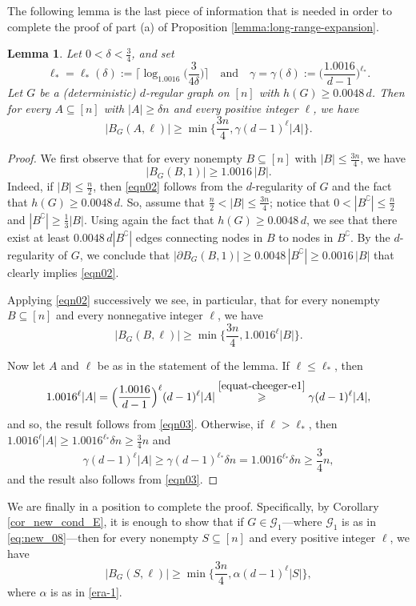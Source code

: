 \documentclass[11pt,leqno]{amsart}
\newtheorem{lemma}[theorem]{Lemma}
\theoremstyle{remark}
\theoremstyle{plain}
\begin{document}
The following lemma is the last piece of information that is needed in order to complete the proof of part (a)
of Proposition \ref{lemma:long-range-expansion}.
\begin{lemma} \label{lemCheeger}
Let $0<\delta< \frac{3}{4}$, and set
\begin{equation} \label{equat-cheeger-e1}
\ell_*=\ell_*(\delta):= \Big\lceil \log_{1.0016}\Big(\frac{3}{4\delta}\Big)\Big\rceil \ \ \ \text{ and } \ \ \
\gamma=\gamma(\delta):= \Big( \frac{1.0016}{d-1}\Big)^{\ell_*}.
\end{equation}
Let $G$ be a (deterministic) $d$-regular graph on $[n]$ with $h(G)\geqslant 0.0048\, d$. Then for every $A\subseteq [n]$
with $|A|\geqslant\delta n$ and every positive integer $\ell$, we have
\[ \big| B_G(A,\ell)\big| \geqslant \min\Big\{\frac{3n}{4},\gamma (d-1)^\ell|A|\Big\}. \]
\end{lemma}
\begin{proof}
We first observe that for every nonempty $B\subseteq [n]$ with $|B|\leqslant \frac{3n}{4}$, we have
\begin{equation} \label{eqn02}
\big| B_G(B,1)\big|\geqslant 1.0016\, |B|.
\end{equation}
Indeed, if $|B|\leqslant \frac{n}{2}$, then \eqref{eqn02} follows from the $d$-regularity of $G$ and
the fact that $h(G)\geqslant 0.0048\, d$. So, assume that $\frac{n}{2}< |B|\leqslant \frac{3n}{4}$;
notice that $0<|B^\complement|\leqslant\frac{n}{2}$ and $|B^\complement|\geqslant\frac{1}{3}|B|$.
Using again the fact that $h(G)\geqslant 0.0048\,d$, we see that there exist at least
$0.0048\, d|B^\complement|$ edges connecting nodes in $B$ to nodes in $B^\complement$.
By the $d$-regularity of $G$, we conclude that $|\partial B_G(B,1)|\geqslant 0.0048\, |B^\complement| \geqslant 0.0016\, |B|$
that clearly implies \eqref{eqn02}.

Applying \eqref{eqn02} successively we see, in particular, that for every nonempty $B\subseteq [n]$ and
every nonnegative integer $\ell$, we have
\begin{equation}\label{eqn03}
\big| B_G(B,\ell)\big| \geqslant \min\Big\{\frac{3n}{4}, 1.0016^\ell|B|\Big\}.
\end{equation}

Now let $A$ and $\ell$ be as in the statement of the lemma. If $\ell\leqslant\ell_*$, then
\[1.0016^\ell|A|= \Big(\frac{1.0016}{d-1}\Big)^\ell (d-1)^\ell|A| \stackrel{\eqref{equat-cheeger-e1}}{\geqslant}
\gamma (d-1)^\ell|A|, \]
and so, the result follows from \eqref{eqn03}. Otherwise, if $\ell>\ell_*$, then
$1.0016^\ell|A| \geqslant 1.0016^{\ell_*}\delta n\geqslant\frac{3}{4}n$ and
\[\gamma (d-1)^\ell|A|\geqslant \gamma (d-1)^{\ell_*}\delta n = 1.0016^{\ell_*}
\delta n\geqslant\frac{3}{4}n, \]
and the result also follows from \eqref{eqn03}.
\end{proof}
We are finally in a position to complete the proof. Specifically, by Corollary \ref{cor_new_cond_E}, it is enough to show that if $G\in\mathcal{G}_1$---where $\mathcal{G}_1$ is as in \eqref{eq:new_08}---then
for every nonempty $S\subseteq [n]$ and every positive integer $\ell$, we have
\[ \big|B_{G}(S,\ell)\big|\geqslant \min\Big\{ \frac{3n}{4}, \alpha (d-1)^\ell |S| \Big\}, \]
where $\alpha$ is as in \eqref{era-1}.
\end{document}
